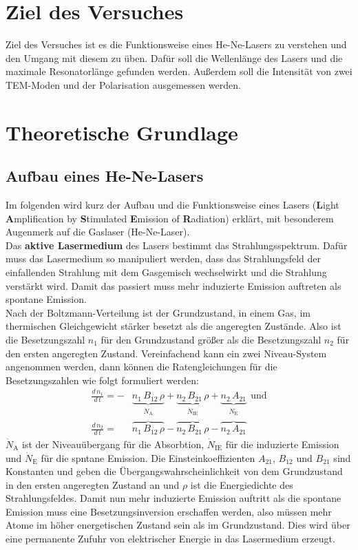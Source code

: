 \section{Ziel des Versuches}
Ziel des Versuches ist es die Funktionsweise eines He-Ne-Lasers zu verstehen und den Umgang mit diesem zu üben. Dafür soll die Wellenlänge des Lasers und die maximale Resonatorlänge gefunden werden. Außerdem soll die Intensität von zwei TEM-Moden und der Polarisation ausgemessen werden.


\section{Theoretische Grundlage}
\subsection{Aufbau eines He-Ne-Lasers}
Im folgenden wird kurz der Aufbau und die Funktionsweise eines Lasers (\textbf{L}ight \textbf{A}mplification by \textbf{S}timulated \textbf{E}mission of \textbf{R}adiation) erklärt, mit besonderem Augenmerk auf die Gaslaser (He-Ne-Laser). \\
Das \textbf{aktive Lasermedium} des Lasers bestimmt das Strahlungsspektrum. Dafür muss das Lasermedium so manipuliert werden, dass das Strahlungsfeld der einfallenden Strahlung mit dem Gasgemisch wechselwirkt und die Strahlung verstärkt wird. Damit das passiert muss mehr induzierte Emission auftreten als spontane Emission. \\
Nach der Boltzmann-Verteilung ist der Grundzustand, in einem Gas, im thermischen Gleichgewicht stärker besetzt als die angeregten Zustände. Also ist die Besetzungszahl $n_1$ für den Grundzustand größer als die Besetzungszahl $n_2$ für den ersten angeregten Zustand. Vereinfachend kann ein zwei Niveau-System angenommen werden, dann können die Ratengleichungen für die Besetzungszahlen wie folgt formuliert werden:
\begin{align}
	\frac{d\,n_1}{d\,t} = - &\underbrace{n_1\,B_{12}\,\rho}_{\dot{N}_\text{A}} + \underbrace{n_2\,B_{21}\,\rho}_{\dot{N}_\text{IE}} + \underbrace{n_2\,A_{21}}_{\dot{N}_\text{E}}\ \ \text{und}\\
	\frac{d\,n_2}{d\,t} = \ \ \ &\overbrace{n_1\,B_{12}\,\rho}_{} - \overbrace{n_2\,B_{21}\,\rho}_{} - \overbrace{n_2\,A_{21}}_{}
\end{align}
$\dot{N}_\text{A}$ ist der Niveauübergang für die Absorbtion, $\dot{N}_\text{IE}$ für die induzierte Emission und $\dot{N}_\text{E}$ für die spntane Emission. Die Einsteinkoeffizienten $A_{21}$, $B_{12}$ und $B_{21}$ sind Konstanten und geben die Übergangswahrscheinlichkeit von dem Grundzustand in den ersten angeregten Zustand an und $\rho$ ist die Energiedichte des Strahlungsfeldes. Damit nun mehr induzierte Emission auftritt als die spontane Emission muss eine Besetzungsinversion erschaffen werden, also müssen mehr Atome im höher energetischen Zustand sein als im Grundzustand. Dies wird über eine permanente Zufuhr von elektrischer Energie in das Lasermedium erzeugt. \\
